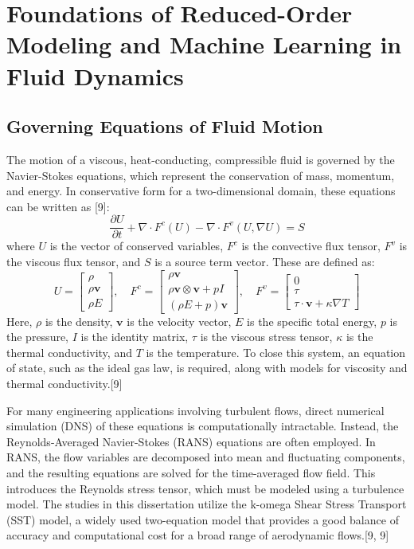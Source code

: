 \documentclass[12pt, a4paper]{report}
\begin{document}
\chapter{Foundations of Reduced-Order Modeling and Machine Learning in Fluid Dynamics}

\section{Governing Equations of Fluid Motion}
The motion of a viscous, heat-conducting, compressible fluid is governed by the Navier-Stokes equations, which represent the conservation of mass, momentum, and energy. In conservative form for a two-dimensional domain, these equations can be written as [9]:
$$\frac{\partial U}{\partial t} + \nabla \cdot F^c(U) - \nabla \cdot F^v(U, \nabla U) = S$$
where $U$ is the vector of conserved variables, $F^c$ is the convective flux tensor, $F^v$ is the viscous flux tensor, and $S$ is a source term vector. These are defined as:
$$
U = \begin{bmatrix} \rho \\ \rho \mathbf{v} \\ \rho E \end{bmatrix}, \quad
F^c = \begin{bmatrix} \rho \mathbf{v} \\ \rho \mathbf{v} \otimes \mathbf{v} + pI \\ (\rho E + p)\mathbf{v} \end{bmatrix}, \quad
F^v = \begin{bmatrix} 0 \\ \tau \\ \tau \cdot \mathbf{v} + \kappa \nabla T \end{bmatrix}
$$
Here, $\rho$ is the density, $\mathbf{v}$ is the velocity vector, $E$ is the specific total energy, $p$ is the pressure, $I$ is the identity matrix, $\tau$ is the viscous stress tensor, $\kappa$ is the thermal conductivity, and $T$ is the temperature. To close this system, an equation of state, such as the ideal gas law, is required, along with models for viscosity and thermal conductivity.[9]

For many engineering applications involving turbulent flows, direct numerical simulation (DNS) of these equations is computationally intractable. Instead, the Reynolds-Averaged Navier-Stokes (RANS) equations are often employed. In RANS, the flow variables are decomposed into mean and fluctuating components, and the resulting equations are solved for the time-averaged flow field. This introduces the Reynolds stress tensor, which must be modeled using a turbulence model. The studies in this dissertation utilize the k-omega Shear Stress Transport (SST) model, a widely used two-equation model that provides a good balance of accuracy and computational cost for a broad range of aerodynamic flows.[9, 9]
\end{document}
